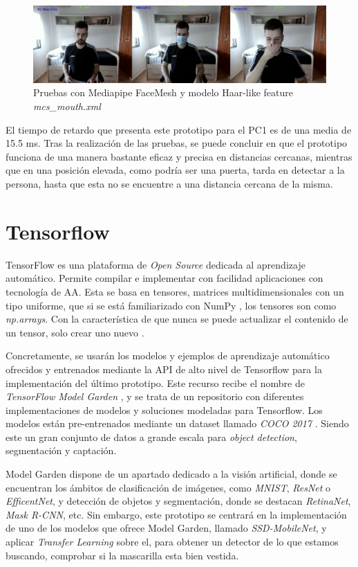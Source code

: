\begin{figure}[htp]
	\centering
	\includegraphics[width=17cm]{imagenes/mediapipe_prueba.png}
	\caption{Pruebas con Mediapipe FaceMesh y modelo Haar-like feature \textit{mcs\_mouth.xml}}
	\label{fig:protoMediapipe}
\end{figure}

El tiempo de retardo que presenta este prototipo para el PC1 es de una media de 15.5 ms. Tras la realización de las pruebas, se puede concluir en que el prototipo funciona de una manera bastante eficaz y precisa en distancias cercanas, mientras que en una posición elevada, como podría ser una puerta, tarda en detectar a la persona, hasta que esta no  se encuentre a una distancia cercana de la misma.

\newpage
\section{Tensorflow}

TensorFlow es una plataforma de \textit{Open Source} dedicada al aprendizaje automático. Permite compilar e implementar con facilidad aplicaciones con tecnología de AA. Esta se basa en tensores, matrices multidimensionales con un tipo uniforme, que si se está familiarizado con NumPy , los tensores son como \textit{np.arrays}. Con la característica de que nunca se puede actualizar el contenido de un tensor, solo crear uno nuevo \cite{tensorflow}.

Concretamente, se usarán los modelos y ejemplos de aprendizaje automático ofrecidos y entrenados mediante la API de alto nivel de Tensorflow para la implementación del último prototipo. Este recurso recibe el nombre de \textit{TensorFlow Model Garden} \cite{modelGarden}, y se trata de un repositorio con diferentes implementaciones de modelos y soluciones modeladas para Tensorflow. Los modelos están pre-entrenados mediante un dataset llamado \textit{COCO 2017} \cite{coco}. Siendo este un gran conjunto de datos a grande escala para \textit{object detection}, segmentación y captación.

Model Garden dispone de un apartado dedicado a la visión artificial, donde se encuentran los ámbitos de clasificación de imágenes, como \textit{MNIST}, \textit{ResNet} o \textit{EfficentNet}, y detección de objetos y segmentación, donde se destacan \textit{RetinaNet}, \textit{Mask R-CNN}, etc. Sin embargo, este prototipo se centrará en la implementación de uno de los modelos que ofrece Model Garden, llamado \textit{SSD-MobileNet}, y aplicar \textit{Transfer Learning} sobre el, para obtener un detector de lo que estamos buscando, comprobar si la mascarilla esta bien vestida.

